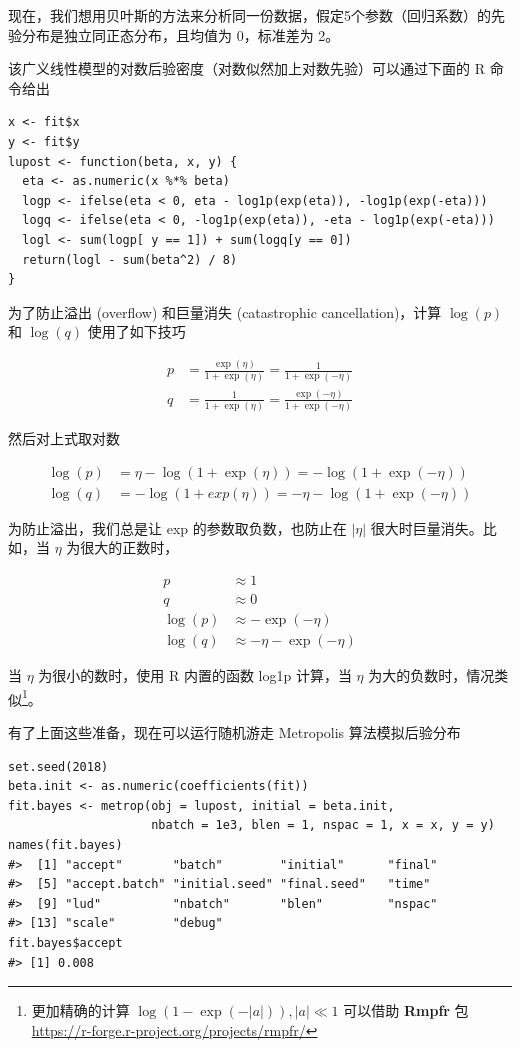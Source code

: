 \documentclass[12pt,a4paper,UTF8,twoside]{book}
\theoremstyle{definition}
\theoremstyle{definition}
\theoremstyle{definition}
\theoremstyle{remark}
\begin{document}
现在，我们想用贝叶斯的方法来分析同一份数据，假定5个参数（回归系数）的先验分布是独立同正态分布，且均值为
0，标准差为 2。

该广义线性模型的对数后验密度（对数似然加上对数先验）可以通过下面的 R
命令给出

\begin{verbatim}
x <- fit$x
y <- fit$y
lupost <- function(beta, x, y) {
  eta <- as.numeric(x %*% beta)
  logp <- ifelse(eta < 0, eta - log1p(exp(eta)), -log1p(exp(-eta)))
  logq <- ifelse(eta < 0, -log1p(exp(eta)), -eta - log1p(exp(-eta)))
  logl <- sum(logp[ y == 1]) + sum(logq[y == 0])
  return(logl - sum(beta^2) / 8)
}
\end{verbatim}

为了防止溢出 (overflow) 和巨量消失 (catastrophic cancellation)，计算
\(\log(p)\) 和 \(\log(q)\) 使用了如下技巧

\begin{align*}
p &= \frac{\exp(\eta)}{1 + \exp(\eta)} = \frac{1}{1 + \exp(- \eta)} \\
q &= \frac{1}{1 + \exp(\eta)} = \frac{\exp(- \eta)}{1 + \exp(- \eta)}
\end{align*}

然后对上式取对数

\begin{align*}
\log(p) &= \eta - \log(1 + \exp(\eta)) = - \log(1 + \exp(- \eta)) \\
\log(q) &= - \log(1 + exp(\eta)) = - \eta - \log(1 + \exp(-\eta))
\end{align*}

为防止溢出，我们总是让 exp 的参数取负数，也防止在 \(|\eta|\)
很大时巨量消失。比如，当 \(\eta\) 为很大的正数时，

\begin{align*}
p & \approx  1  \\
q & \approx  0 \\
\log(p) & \approx  - \exp(-\eta) \\
\log(q) & \approx  - \eta - \exp(-\eta)
\end{align*}

当 \(\eta\) 为很小的数时，使用 R 内置的函数 log1p 计算，当 \(\eta\)
为大的负数时，情况类似\footnote{更加精确的计算
  \(\log(1-\exp(-|a|)), |a| \ll 1\) 可以借助 \textbf{Rmpfr} 包
  \url{https://r-forge.r-project.org/projects/rmpfr/}}。

有了上面这些准备，现在可以运行随机游走 Metropolis 算法模拟后验分布

\begin{verbatim}
set.seed(2018)
beta.init <- as.numeric(coefficients(fit))
fit.bayes <- metrop(obj = lupost, initial = beta.init, 
                    nbatch = 1e3, blen = 1, nspac = 1, x = x, y = y)
names(fit.bayes)
#>  [1] "accept"       "batch"        "initial"      "final"       
#>  [5] "accept.batch" "initial.seed" "final.seed"   "time"        
#>  [9] "lud"          "nbatch"       "blen"         "nspac"       
#> [13] "scale"        "debug"
fit.bayes$accept
#> [1] 0.008
\end{verbatim}
\end{document}
